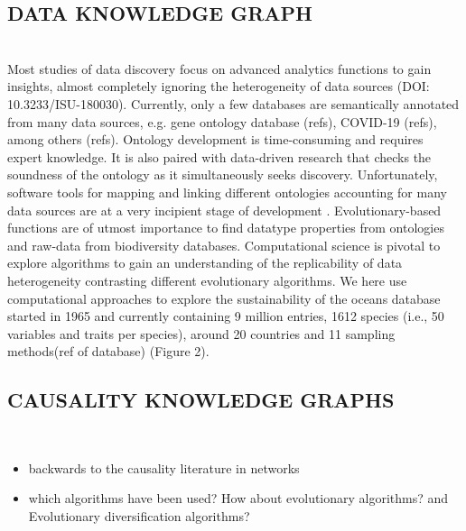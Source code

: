 \documentclass[12pt,a4paper]{article}
\begin{document}
\subsection{DATA KNOWLEDGE GRAPH}
\\
Most studies of data discovery focus on advanced analytics functions to gain insights, almost completely ignoring the heterogeneity of data sources (DOI: 10.3233/ISU-180030). Currently, only a few databases are semantically annotated from many data sources, e.g. gene ontology database (refs), COVID-19 (refs), among others (refs). Ontology development is time-consuming and requires expert knowledge. It is also paired with data-driven research that checks the soundness of the ontology as it simultaneously seeks discovery. Unfortunately, software tools for mapping and linking different ontologies accounting for many data sources are at a very incipient stage of development \cite{nsf,KGcovid19,Oavida}. Evolutionary-based functions are of utmost importance to find datatype properties from ontologies and raw-data from biodiversity databases. Computational science is pivotal to explore algorithms to gain an understanding of the replicability of data heterogeneity contrasting different evolutionary algorithms. We here use computational approaches to explore the sustainability of the oceans database started in 1965 and currently containing 9 million entries, 1612 species (i.e., 50 variables and traits per species), around 20 countries and 11 sampling methods(ref of database) (Figure 2).

\subsection{CAUSALITY KNOWLEDGE GRAPHS}
\\
\begin{itemize}
    \item backwards to the causality literature in networks
    \item which algorithms have been used? How about evolutionary algorithms? and Evolutionary diversification algorithms?
\end{itemize}
\end{document}
